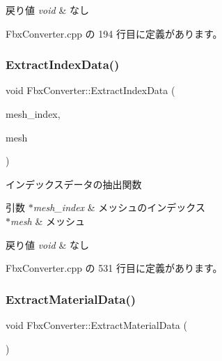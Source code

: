 \begin{DoxyRetVals}{戻り値}
{\em void} & なし \\
\hline
\end{DoxyRetVals}


 Fbx\+Converter.\+cpp の 194 行目に定義があります。

\mbox{\label{class_fbx_converter_a476feb886d898a64f88a0b23cf10651a}} 
\subsubsection{\texorpdfstring{Extract\+Index\+Data()}{ExtractIndexData()}}
{\footnotesize\ttfamily void Fbx\+Converter\+::\+Extract\+Index\+Data (\begin{DoxyParamCaption}\item[{int}]{mesh\+\_\+index,  }\item[{Fbx\+Mesh $\ast$}]{mesh }\end{DoxyParamCaption})\hspace{0.3cm}{\ttfamily [private]}}



インデックスデータの抽出関数 


\begin{DoxyParams}{引数}
{\em $\ast$mesh\+\_\+index} & メッシュのインデックス \\
\hline
{\em $\ast$mesh} & メッシュ \\
\hline
\end{DoxyParams}

\begin{DoxyRetVals}{戻り値}
{\em void} & なし \\
\hline
\end{DoxyRetVals}


 Fbx\+Converter.\+cpp の 531 行目に定義があります。

\mbox{\label{class_fbx_converter_accf269065c211ffb8fc77634bf8dbee9}} 
\subsubsection{\texorpdfstring{Extract\+Material\+Data()}{ExtractMaterialData()}}
{\footnotesize\ttfamily void Fbx\+Converter\+::\+Extract\+Material\+Data (\begin{DoxyParamCaption}{ }\end{DoxyParamCaption})\hspace{0.3cm}{\ttfamily [private]}}



